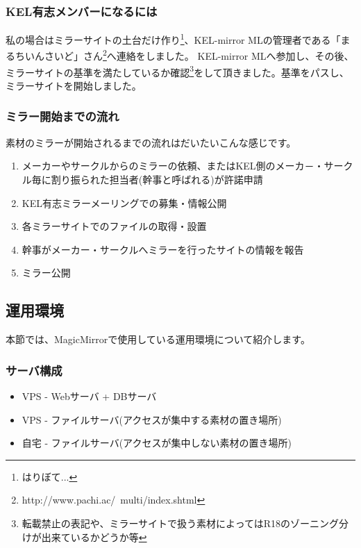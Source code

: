 \subsubsection{KEL有志メンバーになるには}

私の場合はミラーサイトの土台だけ作り\footnote{はりぼて...}、KEL-mirror MLの管理者である「まるちいんさいど」さん\footnote{http://www.pachi.ac/~multi/index.shtml}へ連絡をしました。%
KEL-mirror MLへ参加し、その後、ミラーサイトの基準を満たしているか確認\footnote{転載禁止の表記や、ミラーサイトで扱う素材によってはR18のゾーニング分けが出来ているかどうか等}をして頂きました。基準をパスし、ミラーサイトを開始しました。

\subsubsection{ミラー開始までの流れ}

素材のミラーが開始されるまでの流れはだいたいこんな感じです。\cite{XES}
\begin{enumerate}
 \item メーカーやサークルからのミラーの依頼、またはKEL側のメーカ－・サークル毎に割り振られた担当者(幹事と呼ばれる)が許諾申請
 \item KEL有志ミラーメーリングでの募集・情報公開
 \item 各ミラーサイトでのファイルの取得・設置
 \item 幹事がメーカー・サークルへミラーを行ったサイトの情報を報告
 \item ミラー公開
\end{enumerate}


\subsection{運用環境}
本節では、MagicMirrorで使用している運用環境について紹介します。

\subsubsection{サーバ構成}

\begin{itemize}
 \item VPS - Webサーバ + DBサーバ 
 \item VPS - ファイルサーバ(アクセスが集中する素材の置き場所)
 \item 自宅 - ファイルサーバ(アクセスが集中しない素材の置き場所)
\end{itemize}

